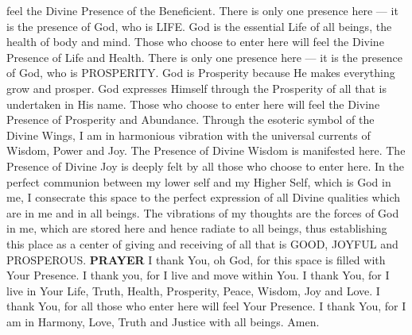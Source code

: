 {\begin{songs}{}
        feel the Divine Presence of the Beneficient.
        \parspace
        There is only one presence here --- it is the
        presence of God, who is LIFE. God is the essential
        Life of all beings, the health of body and mind.
        Those who choose to enter here will feel the Divine
        Presence of Life and Health.
        \parspace
        There is only one presence here --- it is the
        presence of God, who is PROSPERITY. God is
        Prosperity because He makes everything grow and
        prosper. God expresses Himself through the
        Prosperity of all that is undertaken in His name.
        Those who choose to enter here will feel the
        Divine Presence of Prosperity and Abundance.
        \parspace
        Through the esoteric symbol of the Divine Wings,
        I am in harmonious vibration with the universal
        currents of Wisdom, Power and Joy. The Presence
        of Divine Wisdom is manifested here. The Presence
        of Divine Joy is deeply felt by all those who choose
        to enter here.
        \parspace
        In the perfect communion between my lower self and
        my Higher Self, which is God in me, I consecrate
        this space to the perfect expression of all Divine
        qualities which are in me and in all beings.
        \parspace
        The vibrations of my thoughts are the forces of God
        in me, which are stored here and hence radiate to
        all beings, thus establishing this place as a center
        of giving and receiving of all that is GOOD, JOYFUL
        and PROSPEROUS.
        \parspace
        \textbf{PRAYER}
        \parspace
        I thank You, oh God, for this space is filled with
        Your Presence.
        \parspace
        I thank you, for I live and move within You.
        \parspace
        I thank You, for I live in Your Life, Truth, Health,
        Prosperity, Peace, Wisdom, Joy and Love.
        \parspace
        I thank You, for all those who enter here will feel
        Your Presence.
        \parspace
        I thank You, for I am in Harmony, Love, Truth and
        Justice with all beings.
        \parspace
        Amen.
      \endverse
    \endsong


    \begin{intersong}
    \end{intersong}


  \end{songs}



}
